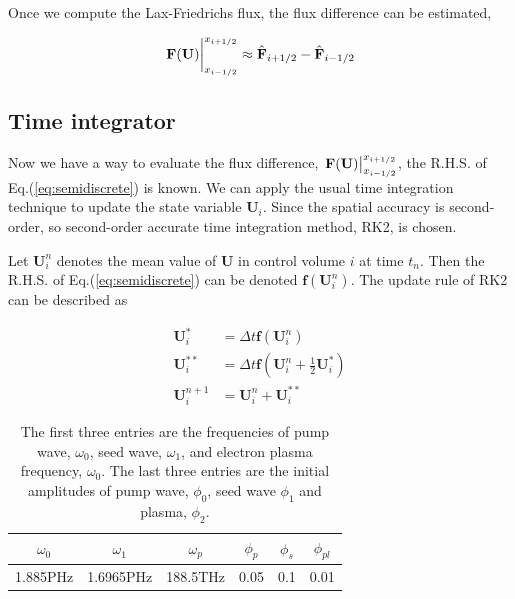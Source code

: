 \documentclass{article}
\begin{document}
    Once we compute the Lax-Friedrichs flux, the flux difference can be estimated,

    \begin{equation}
        \eval{\mathbf{F(U)}}_{x_{i-1/2}}^{x_{i+1/2}} \approx \hat{\mathbf{F}}_{i+1/2} - \hat{\mathbf{F}}_{i-1/2}
    \end{equation}


    \subsection{Time integrator}
    Now we have a way to evaluate the flux difference, $\eval{\mathbf{F(U)}}_{x_{i-1/2}}^{x_{i+1/2}}$, the R.H.S. of Eq.(\ref{eq:semidiscrete}) is known. We can apply the usual time integration technique to update the state variable $\mathbf{U}_i$. Since the spatial accuracy is second-order, so second-order accurate time integration method, RK2, is chosen.

    Let $\mathbf{U}_i^n$ denotes the mean value of $\mathbf{U}$ in control volume $i$ at time $t_n$. Then the R.H.S. of Eq.(\ref{eq:semidiscrete}) can be denoted $\mathbf{f}(\mathbf{U}_i^n)$. The update rule of RK2 can be described as 

    \begin{equation}
        \begin{aligned}
            \mathbf{U}_i^* &= \Delta t\mathbf{f}(\mathbf{U}_i^n) \\
            \mathbf{U}_i^{**} &= \Delta t\mathbf{f}\left(\mathbf{U}_i^n + \frac{1}{2}\mathbf{U}_i^*\right) \\
            \mathbf{U}_i^{n+1} &= \mathbf{U}_i^n + \mathbf{U}_i^{**}
        \end{aligned}
    \end{equation}

    \newpage
    \begin{table} 
        \centering
        \caption{The first three entries are the frequencies of pump wave, $\omega_0$, seed wave, $\omega_1$, and electron plasma frequency, $\omega_0$. The last three entries are the initial amplitudes of pump wave, $\phi_0$, seed wave $\phi_1$ and plasma, $\phi_2$. }
        \begin{tabular}{|c|c|c||c|c|c|}
            \hline
            $\omega_0$ & $\omega_1$ & $\omega_p$ & $\phi_p$ & $\phi_s$ & $\phi_{pl}$  \\
            \hline
            1.885PHz & 1.6965PHz & 188.5THz & 0.05 & 0.1 & 0.01  \\
            \hline
        \end{tabular}
        \label{table:parameters}
    \end{table}
\end{document}
